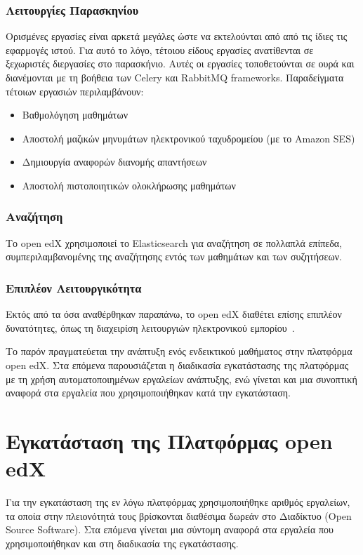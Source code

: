 \documentclass[12pt]{report}
\begin{document}
\subsection{Λειτουργίες Παρασκηνίου}
Ορισμένες εργασίες είναι αρκετά μεγάλες ώστε να εκτελούνται από από τις ίδιες τις εφαρμογές ιστού. Για αυτό το λόγο, τέτοιου είδους εργασίες ανατίθενται σε ξεχωριστές διεργασίες στο παρασκήνιο. Αυτές οι εργασίες τοποθετούνται σε ουρά και διανέμονται με τη βοήθεια των \textlatin{Celery} και \textlatin{RabbitMQ frameworks}. Παραδείγματα τέτοιων εργασιών περιλαμβάνουν:
\begin{itemize}
  \item Βαθμολόγηση μαθημάτων
  \item Αποστολή μαζικών μηνυμάτων ηλεκτρονικού ταχυδρομείου (με το \textlatin{Amazon SES})
  \item Δημιουργία αναφορών διανομής απαντήσεων
  \item Αποστολή πιστοποιητικών ολοκλήρωσης μαθημάτων
\end{itemize}

\subsection{Αναζήτηση}
Το \textlatin{open edX} χρησιμοποιεί το \textlatin{Elasticsearch} για αναζήτηση σε πολλαπλά επίπεδα, συμπεριλαμβανομένης της αναζήτησης εντός των μαθημάτων και των συζητήσεων.

\subsection{Επιπλέον Λειτουργικότητα}
Εκτός από τα όσα αναθέρθηκαν παραπάνω, το \textlatin{open edX} διαθέτει επίσης επιπλέον δυνατότητες, όπως τη διαχειρίση λειτουργιών ηλεκτρονικού εμπορίου~\cite{edx_arch}.

Το παρόν πραγματεύεται την ανάπτυξη ενός ενδεικτικού μαθήματος στην πλατφόρμα \textlatin{open edX}. Στα επόμενα παρουσιάζεται η διαδικασία εγκατάστασης της πλατφόρμας με τη χρήση αυτοματοποιημένων εργαλείων ανάπτυξης, ενώ γίνεται και μια συνοπτική αναφορά στα εργαλεία που χρησιμοποιήθηκαν κατά την εγκατάσταση.

\chapter{Εγκατάσταση της Πλατφόρμας \textlatin{open edX}}\label{ch3}
Για την εγκατάσταση της εν λόγω πλατφόρμας χρησιμοποιήθηκε αριθμός εργαλείων, τα οποία στην πλειονότητά τους βρίσκονται διαθέσιμα δωρεάν στο Διαδίκτυο (\textlatin{Open Source Software}). Στα επόμενα γίνεται μια σύντομη αναφορά στα εργαλεία που χρησιμοποιήθηκαν και στη διαδικασία της εγκατάστασης.
\end{document}
